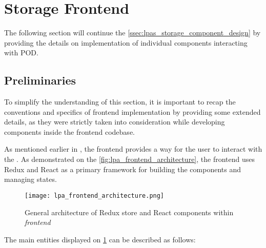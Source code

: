 \section{Storage Frontend}
\label{ssec:storage_frontend_implementation}

The following section will continue the \autoref{ssec:lpas_storage_component_design} by providing the details on implementation of individual components interacting with \solid{} POD. 

\subsection{Preliminaries}
\label{sssec:preliminaries_storage_frontend}

To simplify the understanding of this section, it is important to recap the conventions and specifics of \lpa{} frontend implementation by providing some extended details, as they were strictly taken into consideration while developing \lpas{} components inside the \lpa{} frontend codebase.

As mentioned earlier in , the frontend provides a way for the user to interact with the \lpa{}. As demonstrated on the \autoref{fig:lpa_frontend_architecture}, the frontend uses Redux and React as a primary framework for building the components and managing states.

\begin{figure}[h]
\centering
\texttt{[image: lpa\_frontend\_architecture.png]}
\caption{General architecture of Redux store and React components within \emph{frontend}}
\label{fig:lpa_frontend_architecture}
\end{figure}

The main entities displayed on \ref{fig:lpa_frontend_architecture} can be described as follows:

